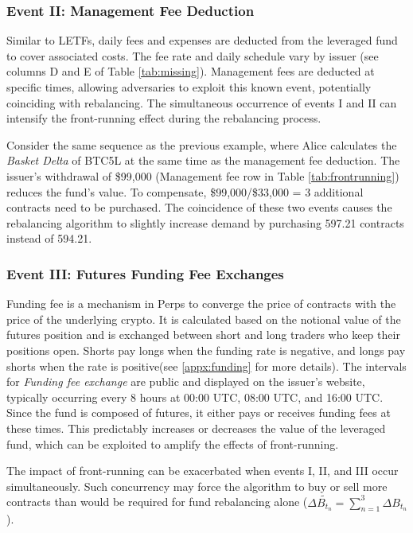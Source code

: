 \subsubsection{Event II: Management Fee Deduction}
Similar to LETFs, daily fees and expenses are deducted from the leveraged fund to cover associated costs. The fee rate and daily schedule vary by issuer (see columns D and E of Table \ref{tab:missing}). Management fees are deducted at specific times, allowing adversaries to exploit this known event, potentially coinciding with rebalancing. The simultaneous occurrence of events I and II can intensify the front-running effect during the rebalancing process.

\begin{example}
	Consider the same sequence as the previous example, where Alice calculates the \textsl{Basket Delta} of BTC5L at the same time as the management fee deduction. The issuer's withdrawal of \$99,000 (Management fee row in Table \ref{tab:frontrunning}) reduces the fund's value. To compensate, \$99,000/\$33,000 = 3 additional contracts need to be purchased. The coincidence of these two events causes the rebalancing algorithm to slightly increase demand by purchasing 597.21 contracts instead of 594.21.
\end{example}

\subsubsection{Event III: Futures Funding Fee Exchanges}\label{fundingfee}
Funding fee is a mechanism in Perps to converge the price of contracts with the price of the underlying crypto. It is calculated based on the notional value of the futures position and is exchanged between short and long traders who keep their positions open. Shorts pay longs when the funding rate is negative, and longs pay shorts when the rate is positive(see \ref{appx:funding} for more details). The intervals for \textsl{Funding fee exchange} are public and displayed on the issuer's website, typically occurring every 8 hours at 00:00 UTC, 08:00 UTC, and 16:00 UTC. Since the fund is composed of futures, it either pays or receives funding fees at these times. This predictably increases or decreases the value of the leveraged fund, which can be exploited to amplify the effects of front-running.

The impact of front-running can be exacerbated when events I, II, and III occur simultaneously. Such concurrency may force the algorithm to buy or sell more contracts than would be required for fund rebalancing alone (\ie $\Delta{\tilde{B_{t_n}}}=\sum_{n=1}^{3}{\Delta{B_{t_{n}}}}$).

